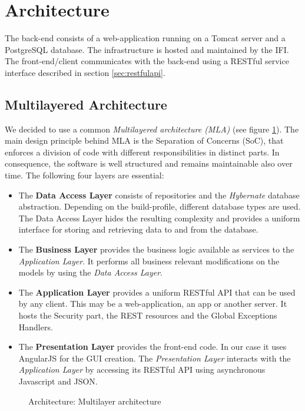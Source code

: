 \newpage
\section{Architecture}

The back-end consists of a web-application running on a Tomcat \cite{tomcat} server and a PostgreSQL\cite{postgresql} database. The infrastructure is hosted and maintained by the IFI. The front-end/client communicates with the back-end using a RESTful service interface described in section \ref{sec:restfulapi}.

\subsection{Multilayered Architecture}
We decided to use a common \textit{Multilayered architecture (MLA)}\cite{mla} (see figure \ref{fig:architecture-layer}). The main design principle behind MLA is the Separation of Concerns (SoC), that enforces a division of code with different responsibilities in distinct parts. In consequence, the software is well structured and remains maintainable also over time. The following four layers are essential:
\begin{itemize}
	\item The \textbf{Data Access Layer} consists of repositories and the \textit{Hybernate} database abstraction. Depending on the build-profile, different database types are used. The Data Access Layer hides the resulting complexity and provides a uniform interface for storing and retrieving data to and from the database.
	\item The \textbf{Business Layer} provides the business logic available as services to the \textit{Application Layer}. It performs all business relevant modifications on the models by using the \textit{Data Access Layer}.	
	\item The \textbf{Application Layer} provides a uniform RESTful API that can be used by any client. This may be a web-application, an app or another server. It hosts the Security part, the REST resources and the Global Exceptions Handlers.
	\item The \textbf{Presentation Layer} provides the front-end code. In our case it uses AngularJS for the GUI creation. The \textit{Presentation Layer} interacts with the \textit{Application Layer} by accessing its RESTful API using asynchronous Javascript and JSON.
\end{itemize}

\begin{figure}[H]
	\centering
	\caption{Architecture: Multilayer architecture}
	\label{fig:architecture-layer}
\end{figure}

